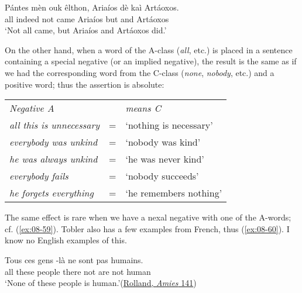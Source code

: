 \ea \label{ex:08-58}
\gll Pántes mèn ouk êlthon, Ariaíos dè kaì Artáoxos.\\
 all indeed not came Ariaíos but and Artáoxos\\
\glt `Not all came, but Ariaíos and Artáoxos did.'
\z

On the other hand, when a word of the A-class (\textit{all}, etc.) is placed in a sentence containing a special negative (or an implied negative), the result is the same as if we had the corresponding word from the C-class (\textit{none}, \textit{nobody}, etc.) and a positive word; thus the assertion is absolute: %



\begin{table}[H]
    \centering
\begin{tabular}{l c l}
\emph{Negative A} & & \emph{means C}\\
\textit{all this is unnecessary} & = & `nothing is necessary'\\
\textit{everybody was unkind} & = & `nobody was kind'\\
\textit{he was always unkind} & = & `he was never kind'\\
\textit{everybody fails} & = & `nobody succeeds'\\
\textit{he forgets everything} & = & `he remembers nothing'\\
\end{tabular}
\end{table}


The same effect is rare when we have a nexal negative with one of the A-words; cf. (\ref{ex:08-59}). Tobler also has a few examples from French, thus (\ref{ex:08-60}). I know no English examples of this. 

\ea \label{ex:08-59}
\gll Tous ces gens -là ne sont pas humains.\\
 all these people there not are not human\\
\glt `None of these people is human.'\hfill(\href{https://www.gutenberg.org/cache/epub/61970/pg61970-images.html}{Rolland, \textit{Amies} 141})
\z

